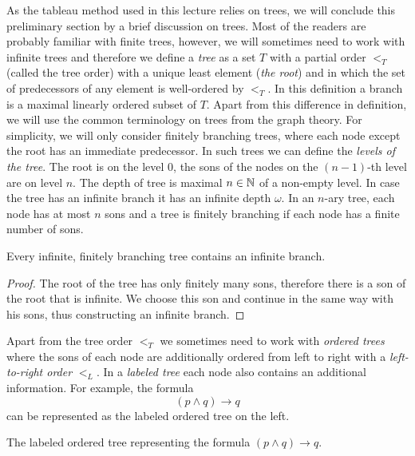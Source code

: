 As the tableau method used in this lecture relies on trees, we will conclude this preliminary section by a brief discussion on trees. Most of the readers are probably familiar with finite trees, however, we will sometimes need to work with infinite trees and therefore we define a \emph{tree} as a set $T$ with a partial order $<_T$ (called the tree order) with a unique least element (\emph{the root}) and in which the set of predecessors of any element is well-ordered by $<_T$. In this definition a branch is a maximal linearly ordered subset of $T$. Apart from this difference in definition, we will use the common terminology on trees from the graph theory. For simplicity, we will only consider finitely branching trees, where each node except the root has an immediate predecessor. In such trees we can define the \emph{levels of the tree}. The root is on the level 0, the sons of the nodes on the $(n-1)$-th level are on level $n$. The depth of tree is maximal $n \in \mathbb{N}$ of a non-empty level. In case the tree has an infinite branch it has an infinite depth $\omega$. In an $n$-ary tree, each node has at most $n$ sons and a tree is finitely branching if each node has a finite number of sons.

\begin{lemma}[König]
Every infinite, finitely branching tree contains an infinite branch.
\end{lemma}
\begin{proof}
The root of the tree has only finitely many sons, therefore there is a son of the root that is infinite. We choose this son and continue in the same way with his sons, thus constructing an infinite branch.
\end{proof}

Apart from the tree order $<_T$ we sometimes need to work with \emph{ordered trees} where the sons of each node are additionally ordered from left to right with a \emph{left-to-right order} $<_L$. In a \emph{labeled tree} each node also contains an additional information. For example, the formula $$(p \land q) \to q$$ can be represented as the labeled ordered tree on the left.

\begin{marginfigure}[-4\baselineskip]
\centering
{}
\caption{The labeled ordered tree representing the formula $(p \land q) \to q$.}
\end{marginfigure}